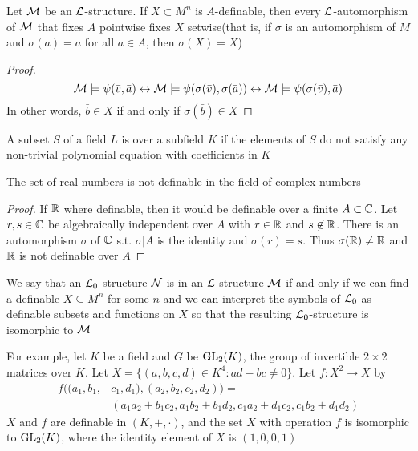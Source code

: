 \documentclass[11pt]{article}
\begin{document}
\begin{proposition}[]
Let \(\mathcal{M}\) be an \(\mathcal{L}\)-structure. If \(X\subset M^n\) is \(A\)-definable,
then every \(\mathcal{L}\)-automorphism of \(\mathcal{M}\) that fixes \(A\) pointwise fixes
\(X\) setwise(that is, if \(\sigma\) is an automorphism of \(M\) and \(\sigma(a)=a\)
for all \(a\in A\), then \(\sigma(X)=X\))
\end{proposition}

\begin{proof}
\begin{equation*}
\mathcal{M}\models\psi(\bar{v},\bar{a})\leftrightarrow
\mathcal{M}\models\psi(\sigma(\bar{v}),\sigma(\bar{a}))\leftrightarrow
\mathcal{M}\models\psi(\sigma(\bar{v}),\bar{a})
\end{equation*}
In other words, \(\bar{b}\in X\) if and only if \(\sigma(\bar{b})\in X\)
\end{proof}

\begin{definition}[]
A subset \(S\) of a field \(L\) is  over a
subfield \(K\) if the elements of 
\(S\) do not satisfy any non-trivial polynomial equation with
coefficients in \(K\) 
\end{definition}


\begin{corollary}[]
The set of real numbers is not definable in the field of complex numbers
\end{corollary}

\begin{proof}
If \(\mathbb{R}\) where definable, then it would be definable over a finite
\(A\subset\mathbb{C}\). Let \(r,s\in\mathbb{C}\) be algebraically independent over \(A\) with
\(r\in\mathbb{R}\) and \(s\not\in\mathbb{R}\). There is an automorphism \(\sigma\) of \(\mathbb{C}\) s.t.
\(\sigma|A\) is the identity and \(\sigma(r)=s\). Thus \(\sigma(\mathbb{R})\neq\mathbb{R}\) and
\(\mathbb{R}\) is not definable over \(A\)
\end{proof}

We say that an \(\mathcal{L}_0\)-structure \(\mathcal{N}\) is  in
an \(\mathcal{L}\)-structure \(\mathcal{M}\) if and only if we can find a definable
\(X\subseteq M^n\) for some \(n\) and we can interpret the symbols of \(\mathcal{L}_0\)
as definable subsets and functions on \(X\) so that the resulting
\(\mathcal{L}_0\)-structure is isomorphic to \(\mathcal{M}\)


For example, let \(K\) be a field and \(G\) be \(\text{GL}_2(K)\), the group of
invertible \(2\times 2\) matrices over \(K\). Let \(X=\{(a,b,c,d)\in K^4:ad-bc\neq
   0\}\). Let \(f:X^2\to X\) by
\begin{align*}
f((a_1,b_1,&c_1,d_1),(a_2,b_2,c_2,d_2))=\\
&(a_1a_2+b_1c_2,a_1b_2+b_1d_2,c_1a_2+d_1c_2,c_1b_2+d_1d_2)
\end{align*}
\(X\) and \(f\) are definable in \((K,+,\cdot)\), and the set \(X\) with operation
\(f\) is isomorphic to \(\text{GL}_2(K)\), where the identity element of \(X\) is
\((1,0,0,1)\) 
\end{document}
